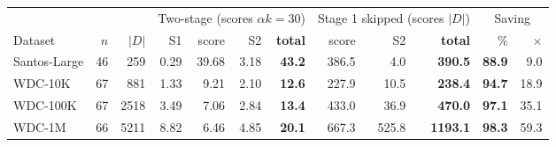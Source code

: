 \begin{tabular}{lrr rrrr rrr rr}
\toprule
& & & \multicolumn{4}{c}{Two-stage (scores $\alpha k{=}30$)} & \multicolumn{3}{c}{Stage 1 skipped (scores $|D|$)} & \multicolumn{2}{c}{Saving} \\
\cmidrule(lr){4-7}\cmidrule(lr){8-10}\cmidrule(lr){11-12}
Dataset & $n$ & $|D|$ & S1 & score & S2 & \textbf{total} & score & S2 & \textbf{total} & \% & $\times$ \\
\midrule
Santos-Large & 46 & 259 & 0.29 & 39.68 & 3.18 & \textbf{43.2} & 386.5 & 4.0 & \textbf{390.5} & \textbf{88.9} & 9.0 \\
WDC-10K & 67 & 881 & 1.33 & 9.21 & 2.10 & \textbf{12.6} & 227.9 & 10.5 & \textbf{238.4} & \textbf{94.7} & 18.9 \\
WDC-100K & 67 & 2518 & 3.49 & 7.06 & 2.84 & \textbf{13.4} & 433.0 & 36.9 & \textbf{470.0} & \textbf{97.1} & 35.1 \\
WDC-1M & 66 & 5211 & 8.82 & 6.46 & 4.85 & \textbf{20.1} & 667.3 & 525.8 & \textbf{1193.1} & \textbf{98.3} & 59.3 \\
\bottomrule
\end{tabular}
